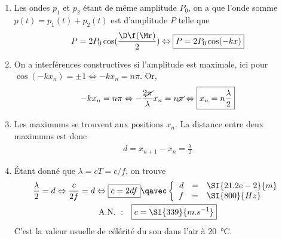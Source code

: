 \documentclass[a4paper, 12pt, final, garamond]{book}
\begin{document}
\begin{enumerate}
    \item Les ondes $p_1$ et $p_2$ étant de même amplitude $P_0$, on a que
        l'onde somme $p(t) = p_1(t) + p_2(t)$ est d'amplitude $P$ telle que
        \[P = 2P_0\cos(\frac{\D\f(\Mr)}{2})
        \Leftrightarrow
        \boxed{P = 2P_0\cos(-kx)}\]
    \item On a interférences constructives si l'amplitude est maximale, ici pour
        $\cos(-kx_n) = \pm 1 \Leftrightarrow -kx_n = n\pi$. Or,
        \begin{gather*}
            -kx_n = n\pi
            \Leftrightarrow
            - \frac{2\cancel{\pi}}{\lambda}x_n = n\cancel{\pi}
            \Leftrightarrow
            \boxed{
            x_n = n \frac{\lambda}{2}}
        \end{gather*}
    \item Les maximums se trouvent aux positions $x_n$. La distance entre deux
        maximums est donc
        \begin{gather*}
            \boxed{d = x_{n+1} - x_n = \frac{\lambda}{2}}
        \end{gather*}
    \item Étant donné que $\lambda = cT = c/f$, on trouve
        \begin{gather*}
            \frac{\lambda}{2} = d
            \Leftrightarrow
            \frac{c}{2f} = d
            \Leftrightarrow
            \boxed{c = 2df}
            \qavec
            \left\{
                \begin{array}{rcl}
                    d & = & \SI{21.2e-2}{m}\\
                    f & = & \SI{800}{Hz}
                \end{array}
            \right.\\
            \mathrm{A.N.~:}\quad
            \boxed{c = \SI{339}{m.s^{-1}}}
        \end{gather*}
        C'est la valeur usuelle de célérité du son dans l'air à
        \SI{20}{\degreeCelsius}.
\end{enumerate}
\end{document}
